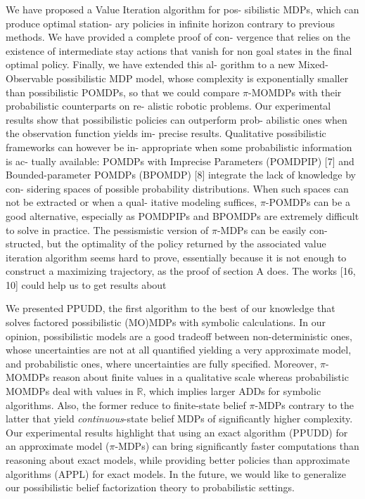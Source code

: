 






We have proposed a Value Iteration algorithm for pos-
sibilistic  MDPs,  which  can  produce  optimal  station-
ary  policies  in  infinite  horizon  contrary  to  previous
methods.  We have provided a complete proof of con-
vergence  that  relies  on  the  existence  of  intermediate
stay actions that vanish for non goal states in the final optimal policy. 
Finally, we have extended this al-
gorithm to a new Mixed-Observable possibilistic MDP
model, whose complexity is exponentially smaller than
possibilistic  POMDPs,  so  that  we  could  compare
$\pi$-MOMDPs with their probabilistic counterparts on re-
alistic  robotic  problems.    Our  experimental  results
show  that  possibilistic  policies  can  outperform  prob-
abilistic ones when the observation function yields im-
precise results.
Qualitative possibilistic frameworks can however be in-
appropriate when some probabilistic information is ac-
tually available:  POMDPs with Imprecise Parameters
(POMDPIP)  [7]  and  Bounded-parameter  POMDPs
(BPOMDP) [8] integrate the lack of knowledge by con-
sidering  spaces  of  possible  probability  distributions.
When such spaces can not be extracted or when a qual-
itative  modeling  suffices, $\pi$-POMDPs  can  be  a  good
alternative, especially as POMDPIPs and BPOMDPs
are  extremely  difficult to solve in practice.
The pessismistic version of $\pi$-MDPs can be easily con-
structed, but the optimality of the policy returned by
the associated value iteration algorithm seems hard to
prove, essentially because it is not enough to construct
a maximizing trajectory, as the proof of section A does.
The works [16, 10] could help us to get results about


We
presented PPUDD, the first algorithm to the best of our knowledge that 
solves factored possibilistic (MO)MDPs with symbolic calculations. In our opinion,
possibilistic models are a good tradeoff between non-deterministic ones, whose
uncertainties are not at all quantified yielding a very approximate model, and
probabilistic ones, where uncertainties are fully specified. Moreover,
$\pi$-MOMDPs reason about finite values in a qualitative scale whereas
probabilistic MOMDPs deal with values in $\mathbb{R}$, which implies larger ADDs
for symbolic algorithms. Also, the former reduce to finite-state belief
$\pi$-MDPs contrary to the latter that yield \emph{continuous}-state belief MDPs
of significantly higher complexity. Our experimental results highlight that using an
exact algorithm (PPUDD) for an approximate model ($\pi$-MDPs) can bring significantly faster computations
than reasoning about exact models, while providing better
policies than approximate algorithms (APPL) for exact models. In the future, we
would like to generalize our possibilistic belief factorization theory to
probabilistic settings. %

